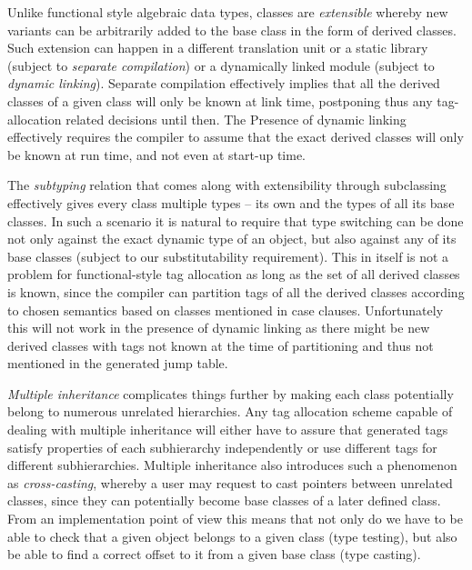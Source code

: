 \documentclass[preprint]{sigplanconf}
\begin{document}
\noindent
Unlike functional style algebraic data types, classes are \emph{extensible} 
whereby new variants can be arbitrarily added to the base class in the form of 
derived classes. Such extension can happen in a different translation unit or a
static library (subject to \emph{separate compilation}) or a dynamically linked 
module (subject to \emph{dynamic linking}). Separate compilation effectively 
implies that all the derived classes of a given class will only be known at link 
time, postponing thus any tag-allocation related decisions until then. The 
Presence of dynamic linking effectively requires the compiler to assume that the 
exact derived classes will only be known at run time, and not even at start-up 
time.


The \emph{subtyping} relation that comes along with extensibility through 
subclassing effectively gives every class multiple types -- its own and the 
types of all its base classes. In such a scenario it is natural to require that 
type switching can be done not only against the exact dynamic type of an object, 
but also against any of its base classes (subject to our substitutability 
requirement). This in itself is not a problem for functional-style tag 
allocation as long as the set of all derived classes is known, since the 
compiler can partition tags of all the derived classes according to chosen 
semantics based on classes mentioned in case clauses.
Unfortunately this will not work in the presence of dynamic linking as there 
might be new derived classes with tags not known at the time of partitioning and 
thus not mentioned in the generated jump table.

\emph{Multiple inheritance} complicates things further by making each class 
potentially belong to numerous unrelated hierarchies. Any tag allocation scheme 
capable of dealing with multiple inheritance will either have to assure that 
generated tags satisfy properties of each subhierarchy independently or use 
different tags for different subhierarchies. Multiple inheritance also 
introduces such a phenomenon as \emph{cross-casting}, whereby a user may request 
to cast pointers between unrelated classes, since they can potentially become 
base classes of a later defined class. From an implementation point of view this 
means that not only do we have to be able to check that a given object belongs 
to a given class (type testing), but also be able to find a correct offset to it 
from a given base class (type casting).
\end{document}
